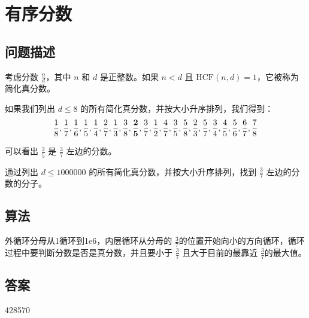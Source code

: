 \section{有序分数}
\subsection{问题描述}
\begin{tcolorbox}
考虑分数 \( \frac{n}{d} \)，其中 \( n \) 和 \( d \) 是正整数。如果 \( n < d \) 且 \( \text{HCF}(n, d) = 1 \)，它被称为简化真分数。

如果我们列出 \( d \leq 8 \) 的所有简化真分数，并按大小升序排列，我们得到：
\[ \frac{1}{8}, \frac{1}{7}, \frac{1}{6}, \frac{1}{5}, \frac{1}{4}, \frac{2}{7}, \frac{1}{3}, \frac{3}{8}, \frac{\bf
2}{\bf 5}, \frac{3}{7}, \frac{1}{2}, \frac{4}{7}, \frac{3}{5}, \frac{5}{8}, \frac{2}{3}, \frac{5}{7}, \frac{3}{4}, \frac{4}{5}, \frac{5}{6}, \frac{6}{7}, \frac{7}{8} \]

可以看出 \( \frac{2}{5} \) 是 \( \frac{3}{7} \) 左边的分数。

通过列出 \( d \leq 1000000 \) 的所有简化真分数，并按大小升序排列，找到 \( \frac{3}{7} \) 左边的分数的分子。

\end{tcolorbox}

\subsection{算法}
外循环分母从1循环到1e6，内层循环从分母的 \( \frac{3}{7}
\)的位置开始向小的方向循环，循环过程中要判断分数是否是真分数，并且要小于 \( \frac{3}{7} \) 且大于目前的最靠近 \(
\frac{3}{7} \)的最大值。


\subsection{答案}
428570
